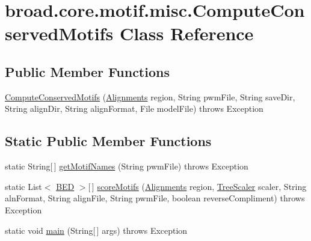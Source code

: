 \hypertarget{classbroad_1_1core_1_1motif_1_1misc_1_1_compute_conserved_motifs}{\section{broad.\+core.\+motif.\+misc.\+Compute\+Conserved\+Motifs Class Reference}
\label{classbroad_1_1core_1_1motif_1_1misc_1_1_compute_conserved_motifs}
}
\subsection*{Public Member Functions}
\begin{DoxyCompactItemize}
\item 
\hyperlink{classbroad_1_1core_1_1motif_1_1misc_1_1_compute_conserved_motifs_a05e3cb6dd1ab74dec72d5d98996a4019}{Compute\+Conserved\+Motifs} (\hyperlink{classbroad_1_1pda_1_1datastructures_1_1_alignments}{Alignments} region, String pwm\+File, String save\+Dir, String align\+Dir, String align\+Format, File model\+File)  throws Exception
\end{DoxyCompactItemize}
\subsection*{Static Public Member Functions}
\begin{DoxyCompactItemize}
\item 
static String\mbox{[}$\,$\mbox{]} \hyperlink{classbroad_1_1core_1_1motif_1_1misc_1_1_compute_conserved_motifs_ab30591bcefe13076a6a388cfc5878bad}{get\+Motif\+Names} (String pwm\+File)  throws Exception
\item 
static List$<$ \hyperlink{classbroad_1_1core_1_1annotation_1_1_b_e_d}{B\+E\+D} $>$\mbox{[}$\,$\mbox{]} \hyperlink{classbroad_1_1core_1_1motif_1_1misc_1_1_compute_conserved_motifs_a9b7d42e8aa1def6c7f8a7b48ecd8b7a5}{score\+Motifs} (\hyperlink{classbroad_1_1pda_1_1datastructures_1_1_alignments}{Alignments} region, \hyperlink{classbroad_1_1core_1_1siphy_1_1_tree_scaler}{Tree\+Scaler} scaler, String aln\+Format, String align\+File, String pwm\+File, boolean reverse\+Compliment)  throws Exception
\item 
static void \hyperlink{classbroad_1_1core_1_1motif_1_1misc_1_1_compute_conserved_motifs_a1220c0081aaf63c12538ba9d2ae9ffc2}{main} (String\mbox{[}$\,$\mbox{]} args)  throws Exception
\end{DoxyCompactItemize}


